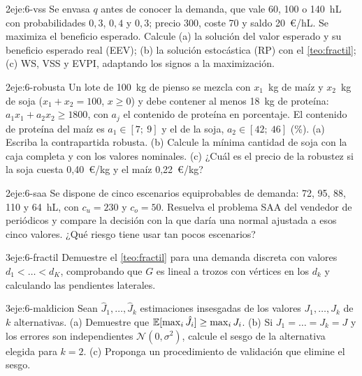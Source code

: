\begin{ejercicio}{2}{eje:6-vss}
Se envasa $q$ antes de conocer la demanda, que vale 60, 100 o 140~hL con probabilidades $0{,}3$, $0{,}4$ y $0{,}3$; precio 300, coste 70 y saldo 20~€/hL. Se maximiza el beneficio esperado. Calcule (a) la solución del valor esperado y su beneficio esperado real (EEV); (b) la solución estocástica (RP) con el \cref{teo:fractil}; (c) WS, VSS y EVPI, adaptando los signos a la maximización.
\end{ejercicio}

\begin{ejercicio}{2}{eje:6-robusta}
Un lote de 100~kg de pienso se mezcla con $x_1$~kg de maíz y $x_2$~kg de soja ($x_1+x_2=100$, $x\ge 0$) y debe contener al menos 18~kg de proteína: $a_1x_1+a_2x_2\ge 1800$, con $a_j$ el contenido de proteína en porcentaje. El contenido de proteína del maíz es $a_1\in[7;\ 9]$ y el de la soja, $a_2\in[42;\ 46]$ (\%). (a) Escriba la contrapartida robusta. (b) Calcule la mínima cantidad de soja con la caja completa y con los valores nominales. (c) ¿Cuál es el precio de la robustez si la soja cuesta 0,40~€/kg y el maíz 0,22~€/kg?
\end{ejercicio}

\begin{ejercicio}{2}{eje:6-saa}
Se dispone de cinco escenarios equiprobables de demanda: 72, 95, 88, 110 y 64~hL, con $c_u=230$ y $c_o=50$. Resuelva el problema SAA del vendedor de periódicos y compare la decisión con la que daría una normal ajustada a esos cinco valores. ¿Qué riesgo tiene usar tan pocos escenarios?
\end{ejercicio}

\begin{ejercicio}{3}{eje:6-fractil}
Demuestre el \cref{teo:fractil} para una demanda discreta con valores $d_1<\dots<d_K$, comprobando que $G$ es lineal a trozos con vértices en los $d_k$ y calculando las pendientes laterales.
\end{ejercicio}

\begin{ejercicio}{3}{eje:6-maldicion}
Sean $\hat J_1,\dots,\hat J_k$ estimaciones insesgadas de los valores $J_1,\dots,J_k$ de $k$ alternativas. (a) Demuestre que $\mathbb{E}[\max_i\hat J_i]\ge\max_iJ_i$. (b) Si $J_1=\dots=J_k=J$ y los errores son independientes $\mathcal N(0,\sigma^{2})$, calcule el sesgo de la alternativa elegida para $k=2$. (c) Proponga un procedimiento de validación que elimine el sesgo.
\end{ejercicio}
